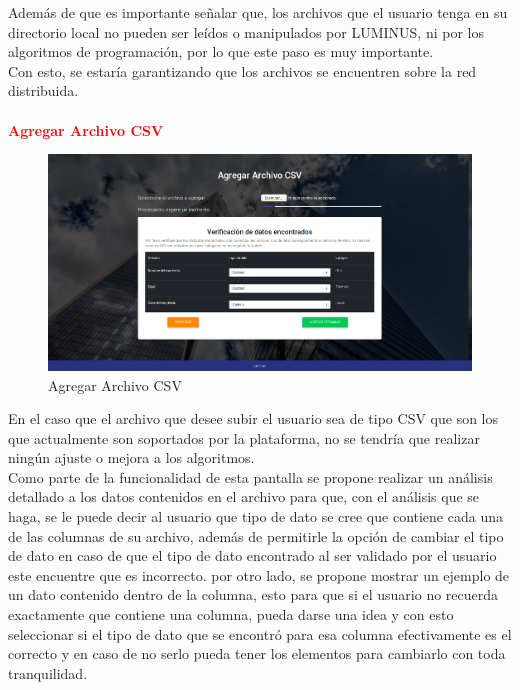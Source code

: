 Además de que es importante señalar que, los archivos que el usuario tenga en su directorio local no pueden ser leídos o manipulados por LUMINUS, ni por los algoritmos de programación, por lo que este paso es muy importante.\\
Con esto, se estaría garantizando que los archivos se encuentren sobre la red distribuida.\\
\\
\textbf{\textcolor{red}{Agregar Archivo CSV}}
\begin{figure}[H]
	\hypertarget{fig:red}{\hspace{1pt}}
	\begin{center}
		\includegraphics[width=.9\textwidth]{capitulo7/images/archivoCSV.png}
		\caption{Agregar Archivo CSV}
		\label{fig:CSV}
	\end{center}
\end{figure}
En el caso que el archivo que desee subir el usuario sea de tipo CSV que son los que actualmente son soportados por la plataforma, no se tendría que realizar ningún ajuste o mejora a los algoritmos. \\
Como parte de la funcionalidad de esta pantalla se propone realizar un análisis detallado a los datos contenidos en el archivo para que, con el análisis que se haga, se le puede decir al usuario que tipo de dato se cree que contiene cada una de las columnas de su archivo, además de permitirle la opción de cambiar el tipo de dato en caso de que el tipo de dato encontrado al ser validado por el usuario este encuentre que es incorrecto. por otro lado, se propone mostrar un ejemplo de un dato contenido dentro de la columna, esto para que si el usuario no recuerda exactamente que contiene una columna, pueda darse una idea y con esto seleccionar si el tipo de dato que se encontró para esa columna efectivamente es el correcto y en caso de no serlo pueda tener los elementos para cambiarlo con toda tranquilidad.\\
